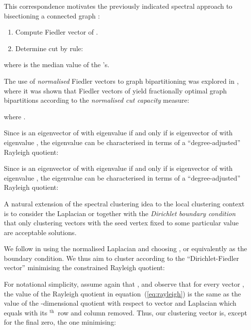 \documentclass{article}
\newcommand{\ignore}[1]{}
\newcommand{\superscript}[1]{\ensuremath{^\textrm{#1}}}
\renewcommand{\th}{\superscript{th}}
\begin{document}
This correspondence motivates the previously indicated 
spectral approach to bisectioning a connected graph 
\cite{DoHo73,Fied73}:
\begin{enumerate}
\item Compute Fiedler vector  of .
\item Determine cut  by rule:
  
\end{enumerate}
where  is the median value of the 's.

The use of \emph{normalised} Fiedler vectors to graph
bipartitioning was explored in \cite{ShMa00},
where it was shown that Fiedler vectors of 
yield fractionally optimal graph bipartitions
according to the {\em normalised cut capacity} measure:

where .

\ignore{
Note that this is quite close to the notion of {\em conductance}
of cut :

}

Since  is an eigenvector of  with
eigenvalue  if and only if 
is eigenvector of  with eigenvalue ,
the eigenvalue  can be characterised
in terms of a ``degree-adjusted'' Rayleigh quotient:

\ignore{
Note that

}

Since  is an eigenvector of  with eigenvalue  if and
only if  is eigenvector of  with
eigenvalue , the eigenvalue  can be
characterised in terms of a ``degree-adjusted'' Rayleigh quotient:


A natural extension of the spectral clustering idea to the local
clustering context is to consider the Laplacian  or  together
with the \emph{Dirichlet boundary condition} that only clustering
vectors  with the seed vertex  fixed to some particular
value are acceptable solutions.

We follow \cite{Chun97,ChEl02} in using the normalised Laplacian 
and choosing , or equivalently 
as the boundary condition.  We thus aim to cluster according to the
``Dirichlet-Fiedler vector'' minimising the constrained Rayleigh
quotient:


For notational simplicity, assume again that , and observe
that for every vector , the value of
the Rayleigh quotient in equation~(\ref{eq:rayleigh}) is the same
as the value of the -dimensional quotient with respect to vector
 and Laplacian  which equals
 with its \th\ row and column removed. Thus, our clustering
vector  is, except for the final zero, the one minimising: 
\end{document}
